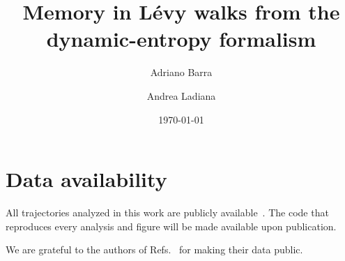 \documentclass[aps,pre,twocolumn,superscriptaddress,floatfix,longbibliography,nofootinbib]{revtex4-2}
\begin{document}
\title{Memory in L\'evy walks from the dynamic-entropy formalism}

\author{Adriano Barra}
\author{Andrea Ladiana}

\date{\today}


\maketitle








\section*{Data availability}
All trajectories analyzed in this work are publicly available~\cite{Sims2019,Castiblanco2019,Jerison2020,Crofoot2015data,MehlhausenFranks2025data}. The code that reproduces every analysis and figure will be made available upon publication.

\begin{acknowledgments}
We are grateful to the authors of Refs.~\cite{Sims2019,Castiblanco2019,Jerison2020,StrandburgPeshkin2015,MehlhausenFranks2025} for making their data public.
\end{acknowledgments}

\appendix



\end{document}
